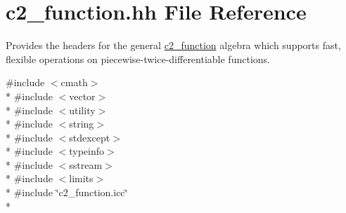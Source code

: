 \hypertarget{c2__function_8hh}{\section{c2\-\_\-function.\-hh File Reference}
\label{c2__function_8hh}
}


Provides the headers for the general \hyperlink{classc2__function}{c2\-\_\-function} algebra which supports fast, flexible operations on piecewise-\/twice-\/differentiable functions.  


{\ttfamily \#include $<$cmath$>$}\\*
{\ttfamily \#include $<$vector$>$}\\*
{\ttfamily \#include $<$utility$>$}\\*
{\ttfamily \#include $<$string$>$}\\*
{\ttfamily \#include $<$stdexcept$>$}\\*
{\ttfamily \#include $<$typeinfo$>$}\\*
{\ttfamily \#include $<$sstream$>$}\\*
{\ttfamily \#include $<$limits$>$}\\*
{\ttfamily \#include \char`\"{}c2\-\_\-function.\-icc\char`\"{}}\\*
